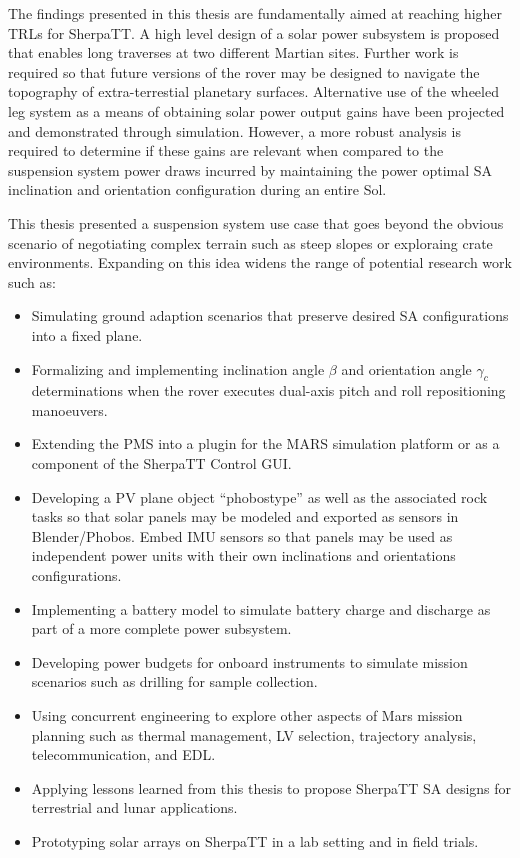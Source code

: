 The findings presented in this thesis are fundamentally aimed at reaching higher \acp{TRL} for SherpaTT. A high level design of a solar power subsystem is proposed that enables long traverses at two different Martian sites. Further work is required so that future versions of the rover may be designed to navigate the topography of extra-terrestial planetary surfaces. Alternative use of the wheeled leg system as a means of obtaining solar power output gains have been projected and demonstrated through simulation. However, a more robust analysis is required to determine if these gains are relevant when compared to the suspension system power draws incurred by maintaining the power optimal \ac{SA} inclination and orientation configuration during an entire Sol.

This thesis presented a suspension system use case that goes beyond the obvious scenario of negotiating complex terrain such as steep slopes or exploraing crate environments. Expanding on this idea widens the range of potential research work such as:

\begin{itemize}
  \item Simulating ground adaption scenarios that preserve desired \ac{SA} configurations into a fixed plane.
  \item Formalizing and implementing  inclination angle $\beta$ and orientation angle $\gamma_{c}$ determinations when the rover executes dual-axis pitch and roll repositioning manoeuvers.
  \item Extending the \ac{PMS} into a plugin for the MARS simulation platform or as a component of the SherpaTT Control GUI.
  \item Developing a \ac{PV} plane object ``phobostype'' as well as the associated rock tasks so that solar panels may be modeled and exported as sensors in Blender/Phobos. Embed \ac{IMU} sensors so that panels may be used as independent power units with their own inclinations and orientations configurations.
  \item Implementing a battery model to simulate battery charge and discharge as part of a more complete power subsystem.
  \item Developing power budgets for onboard instruments to simulate mission scenarios such as drilling for sample collection.
  \item Using concurrent engineering to explore other aspects of Mars mission planning such as thermal management, \ac{LV} selection, trajectory analysis, telecommunication, and \ac{EDL}.
  \item Applying lessons learned from this thesis to propose SherpaTT \ac{SA} designs for terrestrial and lunar applications.
  \item Prototyping solar arrays on SherpaTT in a lab setting and in field trials.
\end{itemize}

